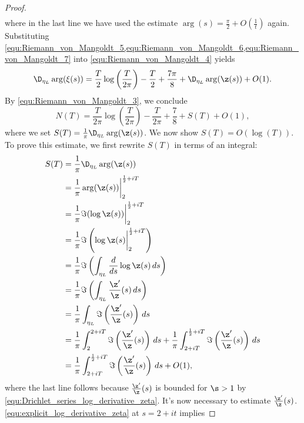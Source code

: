 \begin{proof}
\begin{equation}
\begin{aligned}
          \end{aligned}
        \end{equation}
        where in the last line we have used the estimate $\arg(s) = \frac{\pi}{2}+O\left(\frac{1}{t}\right)$ again. Substituting \cref{equ:Riemann_von_Mangoldt_5,equ:Riemann_von_Mangoldt_6,equ:Riemann_von_Mangoldt_7} into \cref{equ:Riemann_von_Mangoldt_4} yields
        \[
          \D_{\eta_{L}}\arg(\xi(s)) = \frac{T}{2}\log\left(\frac{T}{2\pi}\right)-\frac{T}{2}+\frac{7\pi}{8}+\D_{\eta_{L}}\arg(\z(s))+O(1).
        \]
        By \cref{equ:Riemann_von_Mangoldt_3}, we conclude
        \begin{equation}\label{equ:Riemann_von_Mangoldt_8}
          N(T) = \frac{T}{2\pi}\log\left(\frac{T}{2\pi}\right)-\frac{T}{2\pi}+\frac{7}{8}+S(T)+O(1),
        \end{equation}
        where we set $S(T) = \frac{1}{\pi}\D_{\eta_{L}}\arg(\z(s))$. We now show $S(T) = O(\log(T))$. To prove this estimate, we first rewrite $S(T)$ in terms of an integral:
        \begin{equation}\label{equ:Riemann_von_Mangoldt_9}
          \begin{aligned}
            S(T) &= \frac{1}{\pi}\D_{\eta_{L}}\arg(\z(s)) \\
            &= \frac{1}{\pi}\arg(\z(s))\bigg|_{2}^{\frac{1}{2}+iT} \\
            &= \frac{1}{\pi}\Im(\log\z(s))\bigg|_{2}^{\frac{1}{2}+iT} \\
            &= \frac{1}{\pi}\Im\left(\log\z(s)\bigg|_{2}^{\frac{1}{2}+iT}\right) \\
            &= \frac{1}{\pi}\Im\left(\int_{\eta_{L}}\frac{d}{ds}\log\z(s)\,ds\right) \\
            &= \frac{1}{\pi}\Im\left(\int_{\eta_{L}}\frac{\z'}{\z}(s)\,ds\right) \\
            &= \frac{1}{\pi}\int_{\eta_{L}}\Im\left(\frac{\z'}{\z}(s)\right)\,ds \\
            &= \frac{1}{\pi}\int_{2}^{2+iT}\Im\left(\frac{\z'}{\z}(s)\right)\,ds+\frac{1}{\pi}\int_{2+iT}^{\frac{1}{2}+iT}\Im\left(\frac{\z'}{\z}(s)\right)\,ds \\
            &= \frac{1}{\pi}\int_{2+iT}^{\frac{1}{2}+iT}\Im\left(\frac{\z'}{\z}(s)\right)\,ds+O(1),
          \end{aligned}
        \end{equation}
        where the last line follows because $\frac{\z'}{\z}(s)$ is bounded for $\s > 1$ by \cref{equ:Drichlet_series_log_derivative_zeta}. It's now necessary to estimate $\frac{\z'}{\z}(s)$. \cref{equ:explicit_log_derivative_zeta} at $s = 2+it$ implies

\end{proof}

